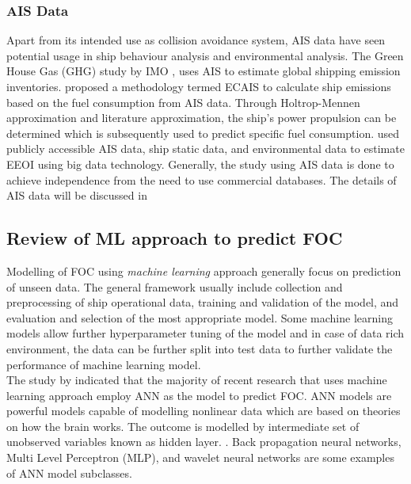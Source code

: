 \subsubsection*{\textbf{AIS Data}} Apart from its intended use as collision avoidance system, AIS data have seen potential usage in ship behaviour analysis and environmental analysis. The Green House Gas (GHG) study by IMO , uses AIS to estimate global shipping emission inventories.  proposed a methodology termed ECAIS to calculate ship emissions based on the fuel consumption from AIS data. Through Holtrop-Mennen approximation and literature approximation, the ship's power propulsion can be determined which is subsequently used to predict specific fuel consumption.  used publicly accessible AIS data, ship static data, and environmental data to estimate EEOI using big data technology. Generally, the study using AIS data is done to achieve independence from the need to use commercial databases. The details of AIS data will be discussed in \\  

\subsection{Review of ML approach to predict FOC}\label{sec:ml_var_appl}

Modelling of FOC using \emph{machine learning} approach generally focus on prediction of unseen data. The general framework usually include collection and preprocessing of ship operational data, training and validation of the model, and evaluation and selection of the most appropriate model. Some machine learning models allow further hyperparameter tuning of the model and in case of data rich environment, the data can be further split into test data to further validate the performance of machine learning model.\\

The study by  indicated that the majority of recent research that uses machine learning approach employ ANN as the model to predict FOC. ANN models are powerful models capable of modelling nonlinear data which are based on theories on how the brain works. The outcome is modelled by intermediate set of unobserved variables known as hidden layer. . Back propagation neural networks, Multi Level Perceptron (MLP), and wavelet neural networks are some examples of ANN model subclasses.\\

